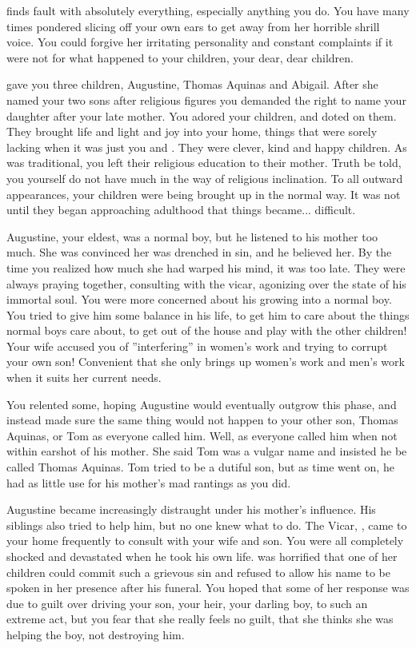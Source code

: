 \documentclass[char]{airship}
\begin{document}
\cJack{} finds fault with absolutely everything, especially anything
you do. You have many times pondered slicing off your own ears to get
away from her horrible shrill voice. You could forgive her irritating
personality and constant complaints if it were not for what happened
to your children, your dear, dear children.

\cJack{} gave you three children, Augustine, Thomas Aquinas and
Abigail. After she named your two sons after religious figures you
demanded the right to name your daughter after your late mother. You
adored your children, and doted on them. They brought life and light
and joy into your home, things that were sorely lacking when it was
just you and \cJack{}. They were clever, kind and happy children. As
was traditional, you left their religious education to their
mother. Truth be told, you yourself do not have much in the way of
religious inclination. To all outward appearances, your children were
being brought up in the normal way. It was not until they began
approaching adulthood that things became... difficult.

Augustine, your eldest, was a normal boy, but he listened to his
mother too much. She was convinced her was drenched in sin, and he
believed her. By the time you realized how much she had warped his
mind, it was too late. They were always praying together, consulting
with the vicar, agonizing over the state of his immortal soul. You
were more concerned about his growing into a normal boy. You tried to
give him some balance in his life, to get him to care about the things
normal boys care about, to get out of the house and play with the
other children! Your wife accused you of ''interfering'' in women's
work and trying to corrupt your own son! Convenient that she only
brings up women's work and men's work when it suits her current needs.

You relented some, hoping Augustine would eventually outgrow this
phase, and instead made sure the same thing would not happen to your
other son, Thomas Aquinas, or Tom as everyone called him. Well, as
everyone called him when not within earshot of his mother. She said
Tom was a vulgar name and insisted he be called Thomas Aquinas. Tom
tried to be a dutiful son, but as time went on, he had as little use
for his mother's mad rantings as you did.

Augustine became increasingly distraught under his mother's
influence. His siblings also tried to help him, but no one knew what
to do. The Vicar, \cVicar{\intro}, came to your home frequently to
consult with your wife and son. You were all completely shocked and
devastated when he took his own life. \cJack{} was horrified that one
of her children could commit such a grievous sin and refused to allow
his name to be spoken in her presence after his funeral. You hoped
that some of her response was due to guilt over driving your son, your
heir, your darling boy, to such an extreme act, but you fear that she
really feels no guilt, that she thinks she was helping the boy, not
destroying him.
\end{document}
